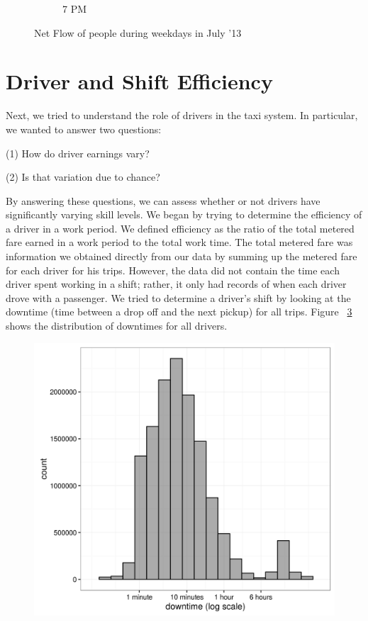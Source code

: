 \documentclass[twocolumn]{article}
\begin{document}
\begin{figure}[h]
\begin{subfigure}{0.5\textwidth}
\caption{7 PM}
\label{fig:7pm}
\end{subfigure}
 
\caption{Net Flow of people during weekdays in July '13}
\label{fig:flow}
\end{figure}

\section{Driver and Shift Efficiency}
Next, we tried to understand the role of drivers in the taxi system. In particular, we wanted to answer two questions:

(1) How do driver earnings vary?

(2) Is that variation due to chance?

By answering these questions, we can assess whether or not drivers have significantly varying skill levels. We began by trying to determine the efficiency of a driver in a work period. We defined efficiency as the ratio of the total metered fare earned in a work period to the total work time. The total metered fare was information we obtained directly from our data by summing up the metered fare for each driver for his trips. However, the data did not contain the time each driver spent working in a shift; rather, it only had records of when each driver drove with a passenger. We tried to determine a driver's shift by looking at the downtime (time between a drop off and the next pickup) for all trips. Figure ~\ref{fig:downtime_distribution} shows the distribution of downtimes for all drivers. 

\begin{figure}[h]
  \centering
  \includegraphics[width=.9\linewidth]{downtime_distribution}
  \label{fig:downtime_distribution}
\end{figure}
\end{document}
